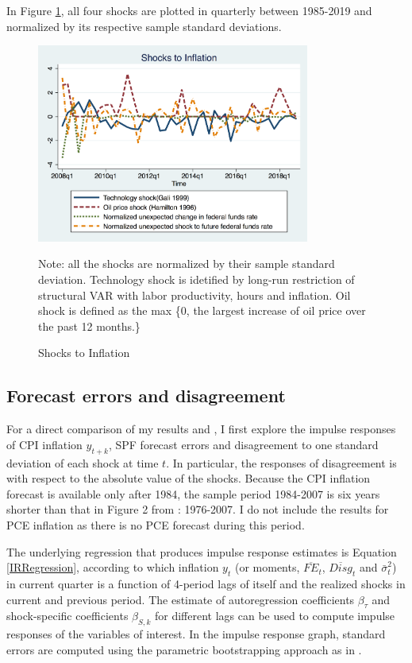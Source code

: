 \documentclass[12pt]{article}
\begin{document}
	
	In Figure \ref{Inflationshocks}, all four shocks are plotted in quarterly between 1985-2019 and normalized by its respective sample standard deviations. 
	
	\begin{figure}[p]
		\centering
		\includegraphics[width=0.8\textwidth,totalheight=0.6\textwidth]{figures/inf_shocksQ.png}
			\begin{flushleft}
			{\footnotesize Note: all the shocks are normalized by their sample standard deviation. Technology shock is idetified by long-run restriction of structural VAR with labor productivity, hours and inflation. Oil shock is defined as the max \{0, the largest increase of oil price over the past 12 months.\} }
		\end{flushleft}
		\caption{ Shocks to Inflation}
		\label{Inflationshocks}
	\end{figure}
	
	\subsection{Forecast errors and disagreement}
	
	For a direct comparison of my results and \citet{coibion2012can}, I first explore the impulse responses of CPI inflation $y_{t+k}$, SPF forecast errors and disagreement to one standard deviation of each shock at time $t$. In particular, the responses of disagreement is with respect to the absolute value of the shocks. Because the CPI inflation forecast is available only after 1984, the sample period 1984-2007 is six years shorter than that in Figure 2 from \citet{coibion2012can}: 1976-2007. I do not include the results for PCE inflation as there is no PCE forecast during this period. 
	
	The underlying regression that produces impulse response estimates is  Equation \ref{IRRegression}, according to which inflation $y_t$ (or moments, $\overline {FE}_{t}$, $\overline{Disg}_t$ and $\bar \sigma^2_t$) in current quarter is a function of 4-period lags of itself and the realized shocks in current and previous period. The estimate of autoregression coefficients $\beta_\tau$ and shock-specific coefficients $\beta_{S,k}$ for different lags can be used to compute impulse responses of the variables of interest. In the impulse response graph, standard errors are computed using the parametric bootstrapping approach as in \citet{coibion2012can}. 
	
\end{document}
